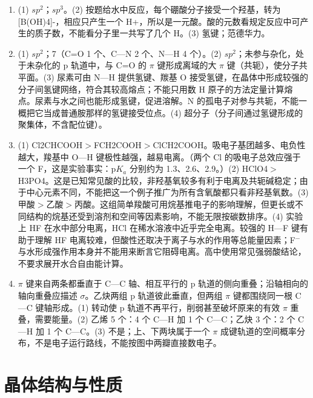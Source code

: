 \documentclass[UTF8,a4paper,zihao=5,oneside,openany,fontset=none]{ctexbook}
\def\sigma{σ}\def\pi{π}\def\Delta{Δ}\def\alpha{α}\def\beta{β}%
\def\mathrm#1{#1}\def\text#1{#1}\def\ensuremath#1{#1}\def\ce#1{#1}%
\newenvironment{jiexilist}{\small\begin{enumerate}[label={\textbf{\arabic*}.},leftmargin=1.6em,itemsep=0.3em,topsep=0.2em]}{\end{enumerate}}
\begin{document}
\begin{jiexilist}
\item (1) $\mathrm{sp}^2$；$\mathrm{sp}^3$。(2) 按题给水中反应，每个硼酸分子接受一个羟基，转为 \ce{[B(OH)4]-}，相应只产生一个 \ce{H+}，所以是一元酸。酸的元数看规定反应中可产生的质子数，不能看分子里一共写了几个 H。(3) 氢键；范德华力。
\item (1) $\mathrm{sp}^2$；7（C=O 1 个、C—N 2 个、N—H 4 个）。(2) $\mathrm{sp}^2$；未参与杂化，处于未杂化的 p 轨道中，与 C=O 的 $\pi$ 键形成离域的大 $\pi$ 键（共轭），使分子共平面。(3) 尿素可由 N—H 提供氢键、羰基 O 接受氢键，在晶体中形成较强的分子间氢键网络，符合其较高熔点；不能只用数 H 原子的方法定量计算熔点。尿素与水之间也能形成氢键，促进溶解。N 的孤电子对参与共轭，不能一概把它当成普通胺那样的氢键接受位点。(4) 超分子（分子间通过氢键形成的聚集体，不含配位键）。
\item (1) \ce{Cl2CHCOOH}$>$\ce{FCH2COOH}$>$\ce{ClCH2COOH}。吸电子基团越多、电负性越大，羧基中 O—H 键极性越强，越易电离。（两个 Cl 的吸电子总效应强于一个 F，这是实验事实：p$K_\text{a}$ 分别约为 1.3、2.6、2.9。）(2) \ce{HClO4}$>$\ce{H3PO4}。这是已知常见酸的比较，非羟基氧较多有利于电离及共轭碱稳定；由于中心元素不同，不能把这一个例子推广为所有含氧酸都只看非羟基氧数。(3) 甲酸$>$乙酸$>$丙酸。这组简单羧酸可用烷基推电子的影响理解，但更长或不同结构的烷基还受到溶剂和空间等因素影响，不能无限按碳数排序。(4) 实验上 HF 在水中部分电离，HCl 在稀水溶液中近乎完全电离。较强的 H—F 键有助于理解 HF 电离较难，但酸性还取决于离子与水的作用等总能量因素；F$^-$ 与水形成强作用本身并不能用来断言它阻碍电离。高中使用常见强弱酸结论，不要求展开水合自由能计算。
\item $\pi$ 键来自两条都垂直于 C—C 轴、相互平行的 p 轨道的侧向重叠；沿轴相向的轴向重叠应描述 $\sigma$。乙炔两组 p 轨道彼此垂直，但两组 $\pi$ 键都围绕同一根 C—C 键轴形成。(1) 转动使 p 轨道不再平行，削弱甚至破坏原来的有效 $\pi$ 重叠，需要能量。(2) 乙烯 5 个：4 个 C—H 加 1 个 C—C；乙炔 3 个：2 个 C—H 加 1 个 C—C。(3) 不是；上、下两块属于一个 $\pi$ 成键轨道的空间概率分布，不是电子运行路线，不能按图中两瓣直接数电子。
\end{jiexilist}
\chapter{晶体结构与性质}
\end{document}
